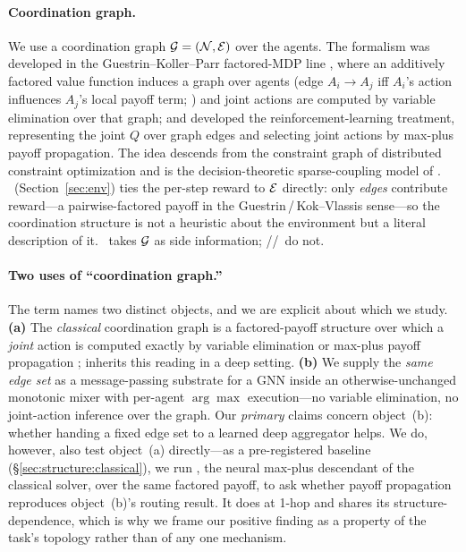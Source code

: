 \paragraph{Coordination graph.} We use a coordination graph
$\mathcal{G} = (\mathcal{N}, \mathcal{E})$ over the agents. The formalism was developed in
the Guestrin--Koller--Parr factored-MDP line
\citep{guestrin_2001_factoredmdp,guestrin_2002_coordrl,guestrin_2003_factoredmdp_jair},
where an additively factored value function induces a graph over agents (edge
$A_i\!\to\!A_j$ iff $A_i$'s action influences $A_j$'s local payoff term;
\citealp{guestrin_2002_contextspecific}) and joint actions are computed by
variable elimination over that graph; \citet{kok_2004_sparseq} and
\citet{kok_2006_payoffprop} developed the reinforcement-learning treatment,
representing the joint $Q$ over graph edges and selecting joint actions by
max-plus payoff propagation. The idea descends from the constraint graph of
distributed constraint optimization \citep{modi_2005_adopt,fioretto_2018_dcopsurvey}
and is the decision-theoretic sparse-coupling model of
\citet{melo_2011_decsimdp}. \coordgrid\ (Section~\ref{sec:env}) ties the
per-step reward to $\mathcal{E}$ directly: only \emph{edges} contribute reward---a
pairwise-factored payoff in the Guestrin\,/\,Kok--Vlassis sense---so the
coordination structure is not a heuristic about the environment but a literal
description of it. \gnnqmix\ takes $\mathcal{G}$ as side information;
\iql/\vdn/\qmix\ do not.

\paragraph{Two uses of ``coordination graph.''} The term names two distinct
objects, and we are explicit about which we study. \textbf{(a)} The
\emph{classical} coordination graph is a factored-payoff structure over which a
\emph{joint} action is computed exactly by variable elimination or max-plus
payoff propagation \citep{guestrin_2003_factoredmdp_jair,kok_2006_payoffprop};
 \citep{boehmer_2020_dcg} inherits this reading in a deep setting.
\textbf{(b)} We supply the \emph{same edge set} as a message-passing substrate
for a GNN inside an otherwise-unchanged monotonic mixer with per-agent
$\arg\max$ execution---no variable elimination, no joint-action inference over
the graph. Our \emph{primary} claims concern object~(b): whether handing a fixed
edge set to a learned deep aggregator helps. We do, however, also test object~(a)
directly---as a pre-registered baseline (\S\ref{sec:structure:classical}), we run
 \citep{boehmer_2020_dcg}, the neural max-plus descendant of the
classical solver, over the same factored payoff, to ask whether payoff
propagation reproduces object~(b)'s routing result. It does at 1-hop and shares
its structure-dependence, which is why we frame our positive finding as a
property of the task's topology rather than of any one mechanism.

